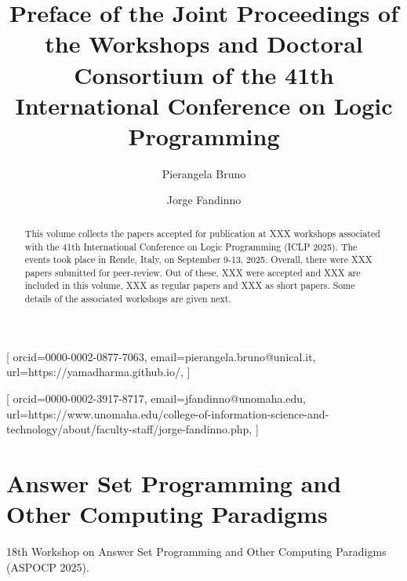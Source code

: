 \documentclass[
]{ceurart}
\begin{document}


\title{Preface of the Joint Proceedings of the Workshops and Doctoral Consortium of the 41th International Conference on Logic Programming}


\author[1]{Pierangela Bruno}[%
orcid=0000-0002-0877-7063,
email=pierangela.bruno@unical.it,
url=https://yamadharma.github.io/,
]
\address[2]{University of Calabria, Italy}


\author[2]{Jorge Fandinno}[%
orcid=0000-0002-3917-8717,
email=jfandinno@unomaha.edu,
url=https://www.unomaha.edu/college-of-information-science-and-technology/about/faculty-staff/jorge-fandinno.php,
]
\address[2]{University of Nebraska Omaha, USA}




\begin{abstract}
This volume collects the papers accepted for publication at XXX workshops associated with the 41th International Conference on Logic Programming (ICLP 2025).
%
The events took place in Rende, Italy, on September 9-13, 2025.
%
Overall, there were XXX papers submitted for peer-review.
%
Out of these, XXX were accepted and XXX are included in this volume, XXX as regular papers and XXX as short papers. Some details of the associated workshops are given next.
\end{abstract}

\maketitle

\section{Answer Set Programming and Other Computing Paradigms}

18th Workshop on Answer Set Programming and Other Computing Paradigms (ASPOCP 2025).
\end{document}
